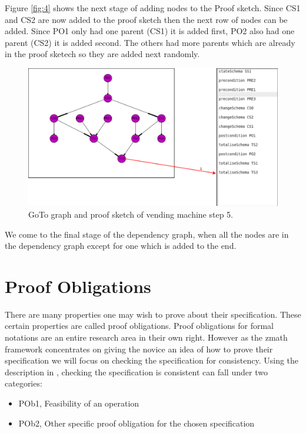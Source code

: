 Figure \ref{fig:4} shows the next stage of adding nodes to the Proof sketch.
Since CS1 and CS2 are now added to the proof sketch then the next row of nodes
can be added. Since PO1 only had one parent (CS1) it is added first, PO2 also
had one parent (CS2) it is added second. The others had more parents which are
already in the proof sketech so they are added next randomly.

\begin{figure}[H]
\includegraphics[scale=0.3]{Figures/skeleton/5.png}
\caption{GoTo graph and proof sketch of vending machine step 5.}
\label{fig:5}
\end{figure}

We come to the final stage of the dependency graph, when all the nodes are in
the dependency graph except for one which is added to the end.

\section{Proof Obligations}
\label{sec:proofobl}

There are many properties one may wish to prove about their specification. These
certain properties are called proof obligations. Proof obligations for formal
notations are an entire research area in their own right. However as the
\gls{zmath} framework concentrates on giving the novice an idea of how to prove
their specification we will focus on checking the specification for consistency.
Using the description in \cite{DBLP:conf/icsea/WenMZ06}, checking the
specification is consistent can fall under two categories:

\begin{itemize}
\item POb1, Feasibility of an operation
\item POb2, Other specific proof obligation for the chosen specification
\end{itemize}


